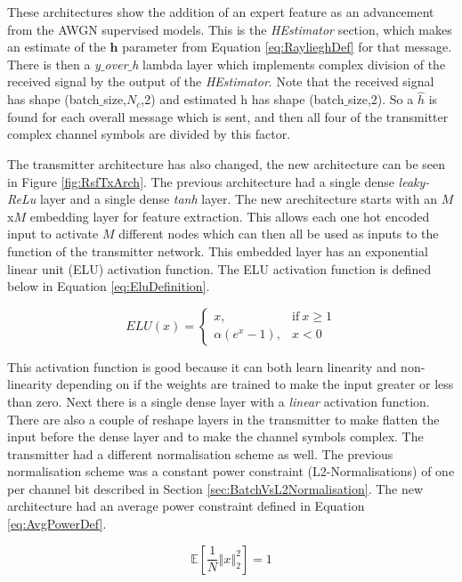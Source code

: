 \documentclass[12pt,onecolumn,letterpaper]{article}
\newcommand{\code}{\textit}
\begin{document}
These architectures show the addition of an expert feature as an advancement from the AWGN supervised models. This is the \code{HEstimator} section, which makes an estimate of the $\mathbf{h}$ parameter from Equation \ref{eq:RaylieghDef} for that message. There is then a \code{y$\_$over$\_$h} lambda layer which implements complex division of the received signal by the output of the \code{HEstimator}. Note that the received signal has shape (batch$\_$size,$N_c$,2) and estimated h has shape (batch$\_$size,2). So a $\hat{h}$ is found for each overall message which is sent, and then all four of the transmitter complex channel symbols are divided by this factor. 

The transmitter architecture has also changed, the new architecture can be seen in Figure \ref{fig:RsfTxArch}. The previous architecture had a single dense \code{leaky-ReLu} layer and a single dense \code{tanh} layer. The new arechitecture starts with an $M$x$M$ embedding layer for feature extraction. This allows each one hot encoded input to activate $M$ different nodes which can then all be used as inputs to the function of the transmitter network. This embedded layer has an exponential linear unit (ELU) activation function. The ELU activation function is defined below in Equation \ref{eq:EluDefinition}.


\begin{equation}
   ELU(x)=
   \begin{cases}
     x, & \text{if}\ x\geq1 \\
     \alpha(e^x-1), & x<0
   \end{cases}
   \label{eq:EluDefinition}
\end{equation}

This activation function is good because it can both learn linearity and non-linearity depending on if the weights are trained to make the input greater or less than zero. Next there is a single dense layer with a \code{linear} activation function. There are also a couple of reshape layers in the transmitter to make flatten the input before the dense layer and to make the channel symbols complex. The transmitter had a different normalisation scheme as well. The previous normalisation scheme was a constant power constraint (L2-Normalisations) of one  per channel bit described in Section \ref{sec:BatchVsL2Normalisation}. The new architecture had an average power constraint defined in Equation \ref{eq:AvgPowerDef}.

\begin{equation}
   \mathbb{E}\left[\frac{1}{N}\left\Vert x\right\Vert_2^2\right] = 1
   \label{eq:AvgPowerDef}
\end{equation}
\end{document}
